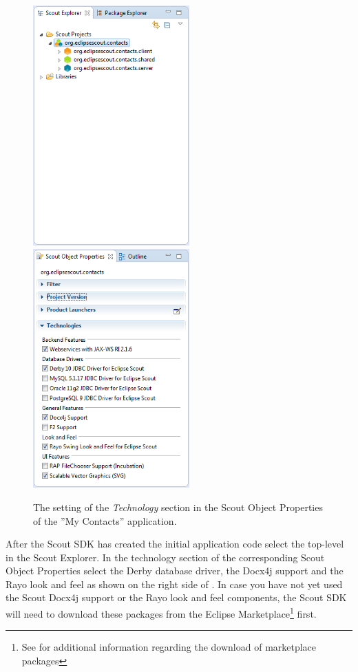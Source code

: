 \documentclass[a4paper,10pt,twoside]{book}
\begin{document}
\begin{figure}
\includegraphics[width=6cm]{project_contacts_explorer.png} \hspace{5mm}
\includegraphics[width=6cm]{project_contacts_properties.png}
\caption{The setting of the \textit{Technology} section in the Scout Object Properties of the ''My Contacts'' application.}
\end{figure}

After the Scout SDK has created the initial application code select the top-level  in the Scout Explorer. 
In the technology section of the corresponding Scout Object Properties select the Derby database driver, the Docx4j support and the Rayo look and feel as shown on the right side of .
In case you have not yet used the Scout Docx4j support or the Rayo look and feel components, the Scout SDK will need to download these packages from the Eclipse Marketplace\footnote{
See  for additional information regarding the download of marketplace packages
}
first. 
\end{document}
